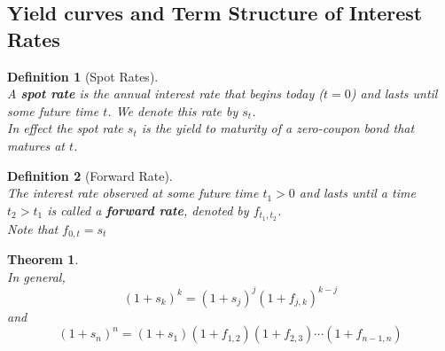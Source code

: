 \documentclass[11pt]{article}
\newtheorem{definition}{Definition}[section]
\newtheorem{theorem}{Theorem}[section]
\theoremstyle{definition}
\begin{document}
\subsection{Yield curves and Term Structure of Interest Rates}
\begin{definition}[Spot Rates]
\hfill\\\normalfont A \textbf{spot rate} is the \textit{annual} interest rate that begins today ($t=0$) and lasts until some future time $t$. We denote this rate by $s_t$.\\In effect the spot rate $s_t$ is the yield to maturity of a zero-coupon bond that matures at $t$.
\end{definition}
\begin{definition}[Forward Rate]
\hfill\\\normalfont The interest rate observed at some future time $t_1>0$ and lasts until a time $t_2>t_1$ is called a \textbf{forward rate}, denoted by $f_{t_1,t_2}$. \\Note that $f_{0,t}=s_t$
\end{definition}
\begin{theorem}
\hfill\\\normalfont In general,
\[
(1+s_k)^k = (1+s_j)^j(1+f_{j,k})^{k-j}
\] 
and
\[
(1+s_n)^n = (1+s_1)(1+f_{1,2})(1+f_{2,3})\cdots(1+f_{n-1,n})
\]
\end{theorem}
\end{document}
